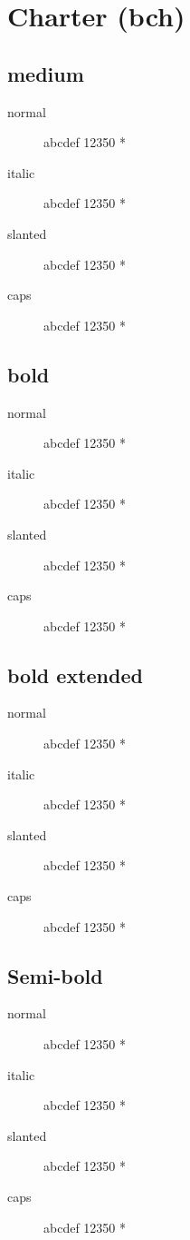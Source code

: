 \section{Charter (bch)}

\subsection{medium}
\begin{description}
    \item [normal]  abcdef 12350 *
    \item [italic]  abcdef 12350 *
    \item [slanted]  abcdef 12350 *
    \item [caps]  abcdef 12350 *
\end{description}
    
\subsection{bold}
\begin{description}
    \item [normal]  abcdef 12350 *
    \item [italic]  abcdef 12350 *
    \item [slanted]  abcdef 12350 *
    \item [caps]  abcdef 12350 *
\end{description}
    
\subsection{bold extended}
\begin{description}
    \item [normal]  abcdef 12350 *
    \item [italic]  abcdef 12350 *
    \item [slanted]  abcdef 12350 *
    \item [caps]  abcdef 12350 *
\end{description}

\subsection{Semi-bold}
\begin{description}
    \item [normal]  abcdef 12350 *
    \item [italic]  abcdef 12350 *
    \item [slanted]  abcdef 12350 *
    \item [caps]  abcdef 12350 *
\end{description}

